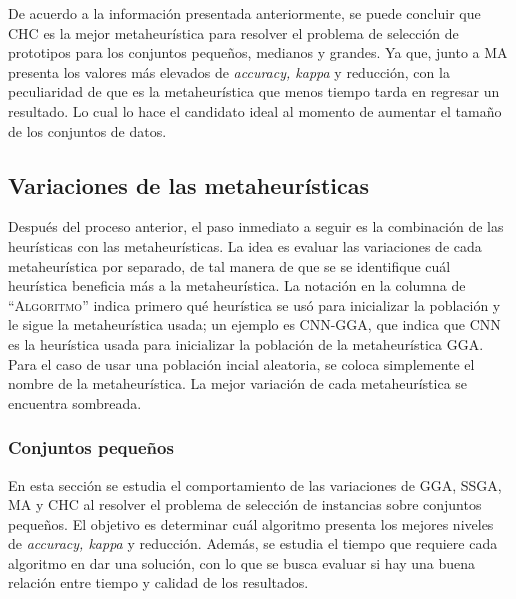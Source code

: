 De acuerdo a la información presentada anteriormente, se puede concluir que CHC es la mejor metaheurística para resolver el problema de selección de prototipos para los conjuntos pequeños, medianos y grandes. Ya que, junto a MA presenta los valores más elevados de \emph{accuracy, kappa} y reducción, con la peculiaridad de que es la metaheurística que menos tiempo tarda en regresar un resultado. Lo cual lo hace el candidato ideal al momento de aumentar el tamaño de los conjuntos de datos.  



\subsection{Variaciones de las metaheurísticas}

Después del proceso anterior, el paso inmediato a seguir es la combinación de las heurísticas con las metaheurísticas. La idea es evaluar las variaciones de cada metaheurística por separado, de tal manera de que se se identifique cuál heurística beneficia más a la metaheurística. La notación en la columna de ``\textsc{Algoritmo}'' indica primero qué heurística se usó para inicializar la población y le sigue la metaheurística usada; un ejemplo es CNN-GGA, que indica que CNN es la heurística usada para inicializar la población de la metaheurística GGA. Para el caso de usar una población incial aleatoria, se coloca simplemente el nombre de la metaheurística. La mejor variación de cada metaheurística se encuentra sombreada.


\subsubsection{Conjuntos pequeños}

En esta sección se estudia el comportamiento de las variaciones de GGA, SSGA, MA y CHC al resolver el problema de selección de instancias sobre conjuntos pequeños. El objetivo es determinar cuál algoritmo presenta los mejores niveles de \emph{accuracy, kappa} y reducción. Además, se estudia el tiempo que requiere cada algoritmo en dar una solución, con lo que se busca evaluar si hay una buena relación entre tiempo y calidad de los resultados.


